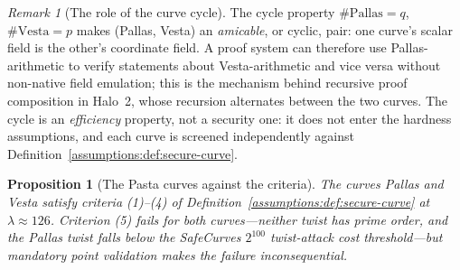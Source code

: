 \documentclass[11pt,a4paper]{article}
\newtheorem{proposition}[theorem]{Proposition}
\theoremstyle{definition}
\theoremstyle{remark}
\newtheorem{remark}[theorem]{Remark}
\begin{document}
\begin{remark}[The role of the curve cycle]
\label{assumptions:rem:cycle}
The cycle property \(\#\mathrm{Pallas} = q\),
\(\#\mathrm{Vesta} = p\) makes (Pallas, Vesta) an \emph{amicable}, or
cyclic, pair: one curve's scalar field is the other's coordinate field.
A proof system can
therefore use Pallas-arithmetic to verify statements about
Vesta-arithmetic and vice versa without non-native field emulation;
this is the mechanism behind recursive proof composition in Halo~2,
whose recursion alternates between the two curves. The cycle is an
\emph{efficiency} property, not a security one: it does not enter the
hardness assumptions, and each curve is screened independently
against Definition~\ref{assumptions:def:secure-curve}.
\end{remark}

\begin{proposition}[The Pasta curves against the criteria]
\label{assumptions:prop:pasta-secure}
The curves Pallas and Vesta satisfy criteria (1)--(4) of
Definition~\ref{assumptions:def:secure-curve} at
\(\lambda \approx 126\). Criterion (5) fails for both curves---neither
twist has prime order, and the Pallas twist falls below the
SafeCurves \(2^{100}\) twist-attack cost threshold---but mandatory
point validation makes the failure inconsequential.
\end{proposition}
\end{document}
